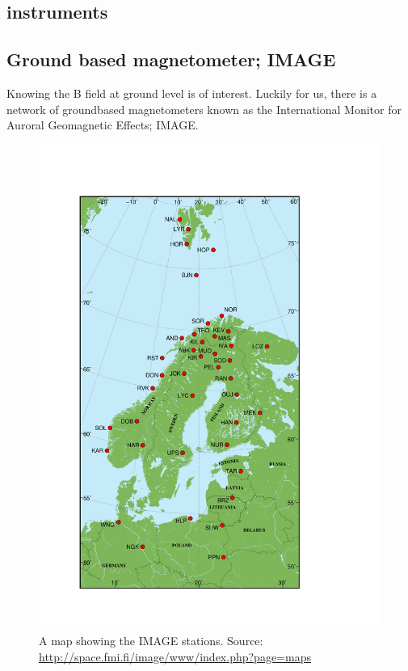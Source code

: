 \documentclass[norsk,a4paper,12pt]{article}
\begin{document}
\begin{multicols}{2}
\section{instruments} %
\label{sec:instruments}
\subsection{Ground based magnetometer; IMAGE}
Knowing the B field at ground level is of interest. Luckily for us, there is a network of groundbased magnetometers known as the International Monitor for Auroral Geomagnetic Effects; IMAGE.\\
\begin{figure}[H]
	\includegraphics[scale = 0.4]{Figures/magnetometer_map.pdf}
	\centering
	\caption{A map showing the IMAGE stations. Source: \url{http://space.fmi.fi/image/www/index.php?page=maps}}
	\label{fig::image_map}
\end{figure}


\end{multicols}
\end{document}

